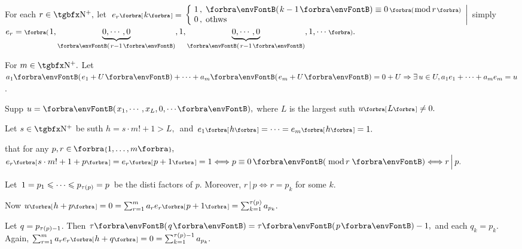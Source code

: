 \vspace{0pt}\par\quad
For each $r\in\Nbp,$ let $\;e_r\Sbra{k}={}${\FontSmall$\hMath[0pt]{l}{\left\{\hspace{-2pt}}{\right|}{1\,,\;\Par{k-1}\equiv 0\,\BigPar{\text{mod}\,r}\\0\,,\;\text{othws}}$} \;simply \,$e_r=\BigPar{1,\underbrace{0,\cdots,0}_{\SmallPar{r-1}},1,\underbrace{0,\cdots,0}_{\SmallPar{r-1}},1,\cdots}.$\vspace{0pt}\par\quad
For $m\in\Nbp.$ Let $a_1\Par{e_1+U}+\dots+a_m\Par{e_m+U}=0+U\Rightarrow\exists\,u\in U,a_1 e_1+\dots+a_m e_m=u$.\vspace{0pt}\par\quad
Supp $u=\Par{x_1,\cdots,x_L,{0,\cdots}},$ where $L$ is the largest suth $u\Sbra{L}\neq 0.$\vspace{1pt}\par\quad
Let $s\in\Nbp$ be suth $h=s\cdot m!+1> L,$ \,and \,$e_1\Sbra{h}=\cdots=e_m\Sbra{h}=1.$\vspace{1pt}\par\quad
\NOTICE that for any $p,r\in\;\!\!\Bra{1,\dots,m},$ \;$e_r\Sbra{s\cdot m!+1+p}=e_r\Sbra{p+1}=1\Longleftrightarrow p\equiv 0\,\Par{\,\text{mod}\,r\,}\Longleftrightarrow r\,\Big|\,p.$\par\vspace{1pt}\quad
Let \,$1=p_1\leqslant\cdots\leqslant p_{\tau(\hspace{0pt}{p}\hspace{0pt})}=p$\, be the disti factors of $p.$ Moreover, $r\,\Big|\,p\Longleftrightarrow r=p_k$ for some $k.$\par\vspace{1pt}\quad
Now $u\Sbra{h+p}=0=\sum_{r=1}^m a_r e_r\Sbra{p+1}=\sum_{k=1}^{\tau\TinyPar{p}}a_{p_k}.$\par\vspace{1pt}\quad
Let $q=p_{\tau(\hspace{0pt}{p}\hspace{0pt})-1}$. Then $\tau\Par{q}=\tau\Par{p}-1,$ and each $q_k=p_k.$ Again, $\sum_{r=1}^m a_r e_r\Sbra{h+q}=0=\sum_{k=1}^{\tau\TinyPar{p}-1}a_{p_k}.$\par\vspace{1pt}\quad

